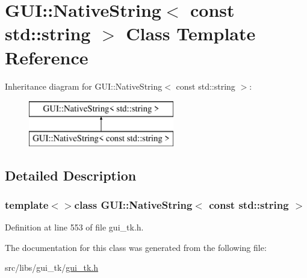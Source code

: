 \hypertarget{classGUI_1_1NativeString_3_01const_01std_1_1string_01_4}{\section{G\-U\-I\-:\-:Native\-String$<$ const std\-:\-:string $>$ Class Template Reference}
\label{classGUI_1_1NativeString_3_01const_01std_1_1string_01_4}
}
Inheritance diagram for G\-U\-I\-:\-:Native\-String$<$ const std\-:\-:string $>$\-:\begin{figure}[H]
\begin{center}
\leavevmode
\includegraphics[height=2.000000cm]{classGUI_1_1NativeString_3_01const_01std_1_1string_01_4}
\end{center}
\end{figure}


\subsection{Detailed Description}
\subsubsection*{template$<$$>$class G\-U\-I\-::\-Native\-String$<$ const std\-::string $>$}



Definition at line 553 of file gui\-\_\-tk.\-h.



The documentation for this class was generated from the following file\-:\begin{DoxyCompactItemize}
\item 
src/libs/gui\-\_\-tk/\hyperlink{gui__tk_8h}{gui\-\_\-tk.\-h}\end{DoxyCompactItemize}
